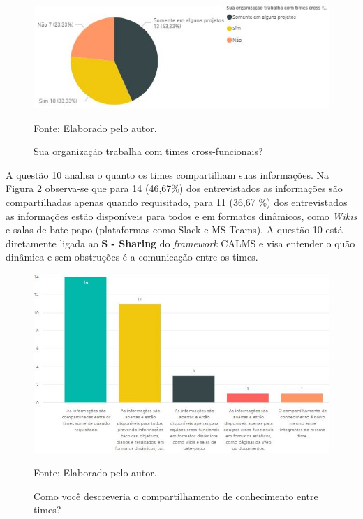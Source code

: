 \documentclass[twoside,english,brazilian]{UNISINOSartigo}
\newcommand{\source}[1]{\caption*{Fonte: {#1}} }
\begin{document}
\begin{figure}[H]
    \centering
    \caption{Sua organização trabalha com times cross-funcionais?}
       \includegraphics[scale=.63]{imagens/crossFuncionais_PBI.JPG}
        \source{Elaborado pelo autor.}
    \label{fig:crossFuncionais}
\end{figure}
A questão 10 analisa o quanto os times compartilham suas informações. Na Figura \ref{fig:compartConhecimento} observa-se que para 14 (46,67\%) dos entrevistados as informações são compartilhadas apenas quando requisitado, para 11 (36,67 \%) dos entrevistados as informações estão disponíveis para todos e em formatos dinâmicos, como \textit{Wikis} e salas de bate-papo (plataformas como Slack e MS Teams). 
A questão 10 está diretamente ligada ao \textbf{S - Sharing} do \textit{framework} CALMS e visa entender o quão dinâmica e sem obstruções é a comunicação entre os times. 
\newline
\begin{figure}[H]
    \centering
    \caption{Como você descreveria o compartilhamento de conhecimento entre times?}
       \includegraphics[scale=.6]{imagens/compartilhamentoConhecimento.JPG}
        \source{Elaborado pelo autor.}
    \label{fig:compartConhecimento}
\end{figure}
\end{document}

